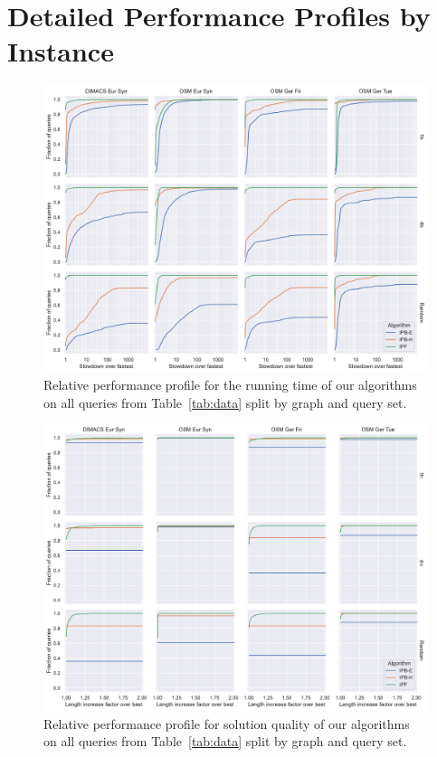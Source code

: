 \documentclass[a4paper,UKenglish,cleveref, autoref, thm-restate]{lipics-v2021}
\begin{document}




\appendix

\section{Detailed Performance Profiles by Instance}\label{sec:perf_profile_instance}

\begin{figure}
\centering
\includegraphics[width=.95\linewidth]{fig/detailed_perf_profile_time.pdf}
\caption{
Relative performance profile for the running time of our algorithms on all queries from Table~\ref{tab:data} split by graph and query set.
}\label{fig:perf_profile_time}
\end{figure}

\begin{figure}
\centering
\includegraphics[width=.95\linewidth]{fig/detailed_perf_profile_quality.pdf}
\caption{
Relative performance profile for solution quality of our algorithms on all queries from Table~\ref{tab:data} split by graph and query set.
}\label{fig:perf_profile_quality}
\end{figure}
\end{document}
